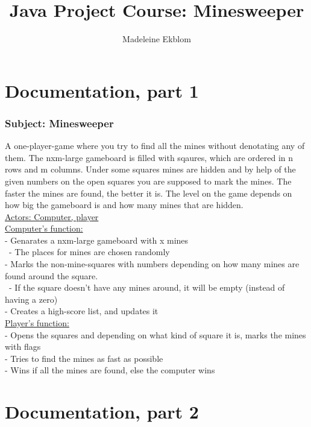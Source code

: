 \documentclass[12pt,twoside,a4paper]{article}
\title{Java Project Course: Minesweeper}
\author{Madeleine Ekblom}
\begin{document}
\maketitle
\section{Documentation, part 1}

\subsubsection*{Subject: Minesweeper}
A one-player-game where you try to find all the mines without denotating any of them. The nxm-large gameboard 
is filled with sqaures, which are ordered in n rows and m columns. Under some squares mines are hidden and by 
help of the given numbers on the open squares you are supposed to mark the mines. The faster the mines are found, 
the better it is. The level on the game depends on how big the gameboard is and how many mines that are hidden.  \\

\underline{Actors: Computer, player} \\ 

\underline{Computer's function:} \\
	- Genarates a nxm-large gameboard with x mines \\
	\ 	- The places for mines are chosen randomly \\
	- Marks the non-mine-squares with numbers depending on how many mines are found around the square. \\
	  \ - If the square doesn't have any mines around, it will be empty (instead of having a zero) \\
	- Creates a high-score list, and updates it  \\

\underline{Player's function:} \\
	- Opens the squares and depending on what kind of square it is, marks the mines with flags \\
	- Tries to find the mines as fast as possible \\ 
	- Wins if all the mines are found, else the computer wins \\

\section{Documentation, part 2}
\end{document}

